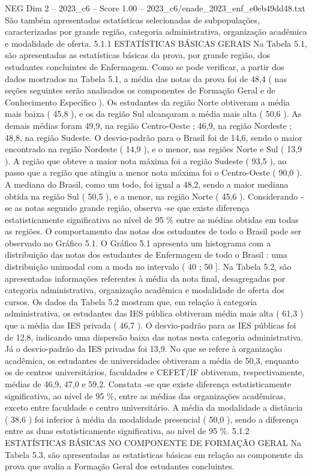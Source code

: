 \begin{textsample}{NEG Dim 2 – 2023\_c6 – Score 1.00 – 2023\_c6/enade\_2023\_enf\_e0eb49dd48.txt}
São também apresentadas estatísticas selecionadas de subpopulações, caracterizadas por grande região, categoria administrativa, organização acadêmica e modalidade de oferta. 5.1.1 ESTATÍSTICAS BÁSICAS GERAIS Na Tabela 5.1, são apresentadas as estatísticas básicas da prova, por grande região, dos estudantes concluintes de Enfermagem.
Como se pode verificar, a partir dos dados mostrados na Tabela 5.1, a média das notas da prova foi de 48,4 ( nas seções seguintes serão analisados os componentes de Formação Geral e de Conhecimento Específico ).
Os estudantes da região Norte obtiveram a média mais baixa ( 45,8 ), e os da região Sul alcançaram a média mais alta ( 50,6 ).
As demais médias foram 49,9, na região Centro-Oeste ; 46,9, na região Nordeste ; 48,8, na região Sudeste.
O desvio-padrão para o Brasil foi de 14,6, sendo o maior encontrado na região Nordeste ( 14,9 ), e o menor, nas regiões Norte e Sul ( 13,9 ).
A região que obteve a maior nota máxima foi a região Sudeste ( 93,5 ), ao passo que a região que atingiu a menor nota máxima foi o Centro-Oeste ( 90,0 ).
A mediana do Brasil, como um todo, foi igual a 48,2, sendo a maior mediana obtida na região Sul ( 50,5 ), e a menor, na região Norte ( 45,6 ).
Considerando -se as notas segundo grande região, observa -se que existe diferença estatisticamente significativa ao nível de 95 \% entre as médias obtidas em todas as regiões.
O comportamento das notas dos estudantes de todo o Brasil pode ser observado no Gráfico 5.1.
O Gráfico 5.1 apresenta um histograma com a distribuição das notas dos estudantes de Enfermagem de todo o Brasil : uma distribuição unimodal com a moda no intervalo ( 40 ; 50 ].
Na Tabela 5.2, são apresentadas informações referentes à média da nota final, desagregadas por categoria administrativa, organização acadêmica e modalidade de oferta dos cursos.
Os dados da Tabela 5.2 mostram que, em relação à categoria administrativa, os estudantes das IES pública obtiveram média mais alta ( 61,3 ) que a média das IES privada ( 46,7 ).
O desvio-padrão para as IES públicas foi de 12,8, indicando uma dispersão baixa das notas nesta categoria administrativa.
Já o desvio-padrão da IES privadas foi 13,9.
No que se refere à organização acadêmica, os estudantes de universidades obtiveram a média de 50,3, enquanto os de centros universitários, faculdades e CEFET/IF obtiveram, respectivamente, médias de 46,9, 47,0 e 59,2.
Constata -se que existe diferença estatisticamente significativa, ao nível de 95 \%, entre as médias das organizações acadêmicas, exceto entre faculdade e centro universitário.
A média da modalidade a distância ( 38,6 ) foi inferior à média da modalidade presencial ( 50,0 ), sendo a diferença entre as duas estatisticamente significativa, ao nível de 95 \%. 5.1.2 ESTATÍSTICAS BÁSICAS NO COMPONENTE DE FORMAÇÃO GERAL Na Tabela 5.3, são apresentadas as estatísticas básicas em relação ao componente da prova que avalia a Formação Geral dos estudantes concluintes.

\end{textsample}
